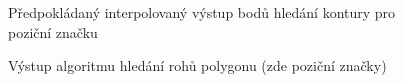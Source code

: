 \begin{figure}[H]
  \begin{center}
    \caption{Předpokládaný interpolovaný výstup bodů hledání kontury pro
    poziční značku}
    \label{FinderMarkContourDetection}
  \end{center}
\end{figure}

\begin{figure}[H]
  \begin{center}
    \caption{Výstup algoritmu hledání rohů polygonu (zde poziční značky)}
    \label{SearchCornersOfPolygonAlgorithm}
  \end{center}
\end{figure}


